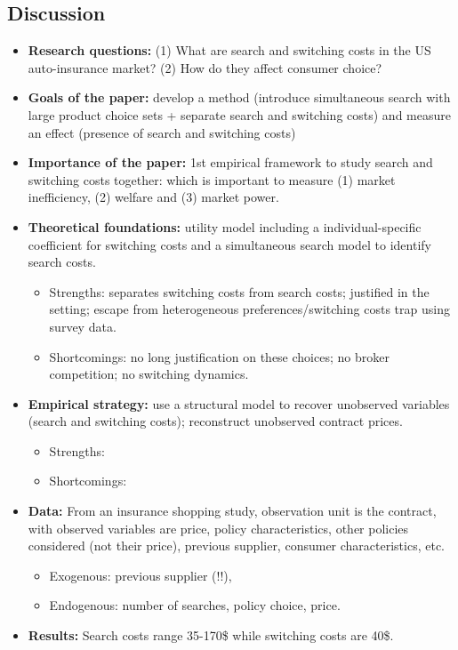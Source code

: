 \subsection{Discussion}

\begin{itemize}
\item \textbf{Research questions:} (1) What are search and switching costs in the US auto-insurance market? (2) How do they affect consumer choice?
\item \textbf{Goals of the paper:} develop a method (introduce simultaneous search with large product choice sets + separate search and switching costs) and measure an effect (presence of search and switching costs)
\item \textbf{Importance of the paper:} 1st empirical framework to study search and switching costs together: which is important to measure (1) market inefficiency, (2) welfare and (3) market power.
\item \textbf{Theoretical foundations:} utility model including a individual-specific coefficient for switching costs and a simultaneous search model to identify search costs. \begin{itemize}
\item Strengths: separates switching costs from search costs; justified in the setting; escape from heterogeneous preferences/switching costs trap using survey data.
\item Shortcomings: no long justification on these choices; no broker competition; no switching dynamics.
\end{itemize}
\item \textbf{Empirical strategy:} use a structural model to recover unobserved variables (search and switching costs); reconstruct unobserved contract prices.\begin{itemize}
\item Strengths: 
\item Shortcomings:
\end{itemize}
\item \textbf{Data:} From an insurance shopping study, observation unit is the contract, with observed variables are price, policy characteristics, other policies considered (not their price), previous supplier, consumer characteristics, etc.
\begin{itemize}
\item Exogenous: previous supplier (!!),
\item Endogenous: number of searches, policy choice, price.
\end{itemize}
\item \textbf{Results:} Search costs range 35-170\$ while switching costs are 40\$.
\end{itemize}
